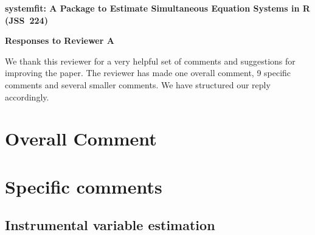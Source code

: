 \documentclass[12pt,english]{scrartcl}
\begin{document}
\begin{center}
{\Large\textbf{
systemfit: A Package to Estimate
Simultaneous Equation Systems in R (JSS~224)}}

\bigskip

{\Large\textbf{Responses to Reviewer A}}
\end{center}


We thank this reviewer for a very helpful set of comments and suggestions
for improving the paper.
The reviewer has made one overall comment, 9 specific comments and
several smaller comments.
We have structured our reply accordingly.

\section{Overall Comment}

\section{Specific comments}

\subsection{Instrumental variable estimation}
\end{document}
